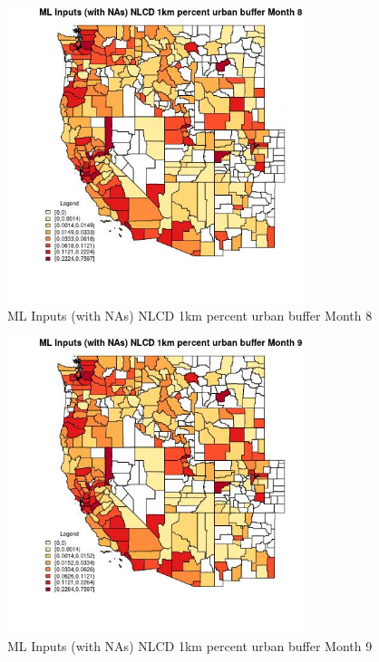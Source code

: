 \begin{figure} 
\centering  
\includegraphics[width=0.77\textwidth]{Code_Outputs/Report_ML_input_PM25_Step4_part_f_de_duplicated_aveswNAs_CountyNLCD_1km_percent_urban_buffermedianMonth8.jpg} 
\caption{\label{fig:Report_ML_input_PM25_Step4_part_f_de_duplicated_aveswNAsCountyNLCD_1km_percent_urban_buffermedianMonth8}ML Inputs (with NAs) NLCD 1km percent urban buffer Month 8} 
\end{figure} 
 

\begin{figure} 
\centering  
\includegraphics[width=0.77\textwidth]{Code_Outputs/Report_ML_input_PM25_Step4_part_f_de_duplicated_aveswNAs_CountyNLCD_1km_percent_urban_buffermedianMonth9.jpg} 
\caption{\label{fig:Report_ML_input_PM25_Step4_part_f_de_duplicated_aveswNAsCountyNLCD_1km_percent_urban_buffermedianMonth9}ML Inputs (with NAs) NLCD 1km percent urban buffer Month 9} 
\end{figure} 
 

